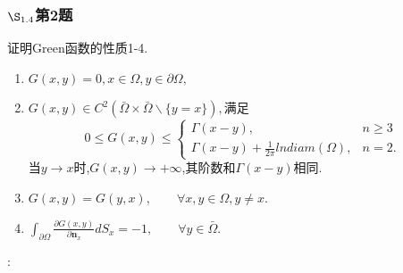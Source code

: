 \documentclass[12pt, a4paper]{ctexart}
\begin{document}
    \subsubsection{$\S_{1.4}$第2题}
    \kaishu{}证明Green函数的性质1-4.\\
    \begin{enumerate}
    	\item $G(x,y)=0,x \in \Omega,y \in \partial \Omega,
    	$\item $G(x,y) \in C^2(\bar{\Omega}\times \bar{\Omega} \backslash \{y=x\}),$满足$$
    	0\le G(x,y) \le \begin{cases}
    	\Gamma(x-y), &n \ge 3\\
    	\Gamma(x-y)+\frac{1}{2\pi}lndiam(\Omega), &n=2.
    	\end{cases}	$$
    	当$y \to x$时,$G(x,y) \to + \infty$,其阶数和$\Gamma(x-y)$相同.
    	\item $G(x,y)=G(y,x), \qquad \forall x,y \in \Omega, y \ne x.
    	$\item $\int_{\partial \Omega} \frac{\partial G(x,y)}{\partial \bm{n}_x}dS_x =-1, \qquad \forall y \in \bar{\Omega}.$
    \end{enumerate}
    
    
    \songti{}:\\
   
\end{document}
